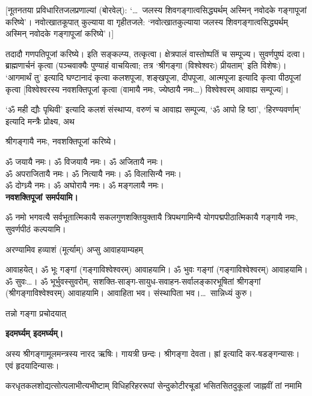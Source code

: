 {\small [नूतनतया प्रविधारितजलप्रणाल्यां (बोरवेल्): `\ldots\ जलस्य शिवगङ्गात्वसिद्ध्यर्थम् अस्मिन्
नवोदके गङ्गापूजां करिष्ये'। नवोत्खातकूपात् कुल्याया वा गृहीतजले: `नवोत्खातकुल्याया जलस्य
शिवगङ्गात्वसिद्ध्यर्थम् अस्मिन् नवोदके गङ्गापूजां करिष्ये'।]\par}

तदादौ गणपतिपूजां करिष्ये। इति सङ्कल्प्य, तत्कृत्वा। क्षेत्रपालं वास्तोष्पतिं च सम्पूज्य।
सुवर्णपुष्पं दत्वा। ब्राह्मणार्चनं कृत्वा (पञ्चवाक्यैः पुण्याहं वाचयित्वा; तत्र `श्रीगङ्गा
(विश्वेश्वरः) प्रीयताम्' इति विशेषः)। `आगमार्थं तु' इत्यादि घण्टानादं कृत्वा कलशपूजा,
शङ्खपूजा, दीपपूजा, आत्मपूजा इत्यादि कृत्वा पीठपूजां कृत्वा [विश्वेश्वरस्य नवशक्तिपूजां कृत्वा
(वामायै नमः, ज्येष्ठायै नमः\ldots) विश्वेश्वरम् आवाह्य सम्पूज्य]।

`ॐ मही द्यौः पृथिवी' इत्यादि कलशं संस्थाप्य, वरुणं च आवाह्य सम्पूज्य, `ॐ आपो हि ष्ठा',
`हिरण्यवर्णाम्' इत्यादि मन्त्रैः प्रोक्ष्य, अथ


श्रीगङ्गायै नमः, नवशक्तिपूजां करिष्ये।

\begin{center}
ॐ जयायै नमः। ॐ विजयायै नमः। ॐ अजितायै नमः।\\
ॐ अपराजितायै नमः। ॐ नित्यायै नमः। ॐ विलासिन्यै नमः।\\
ॐ दोग्ध्र्यै नमः। ॐ अघोरायै नमः। ॐ मङ्गलायै नमः।\\
\textbf{नवशक्तिपूजां समर्पयामि।}
\end{center}

ॐ नमो भगवत्यै सर्वभूतात्मिकायै सकलगुणशक्तियुक्तायै त्रिपथगामिन्यै योगपद्मपीठात्मिकायै
गङ्गायै नमः, सुवर्णपीठं कल्पयामि।

{अरण्यामिव हव्याशं (मूर्त्याम्) अप्सु आवाहयाम्यहम्}

आवाहयेत्। ॐ भूः गङ्गां (गङ्गाविश्वेश्वरम्) आवाहयामि। ॐ भुवः गङ्गां (गङ्गाविश्वेश्वरम्)
आवाहयामि। ॐ सुवः\ldots। ॐ भूर्भुवस्सुवरोम्, सशक्ति-साङ्ग-सायुध-सवाहन-सर्वालङ्कारभूषितां
श्रीगङ्गां (श्रीगङ्गाविश्वेश्वरम्) आवाहयामि। आवाहिता भव। संस्थापिता भव।\ldots\ सान्निध्यं कुरु।

{तन्नो गङ्गा प्रचोदयात्}
\centerline{\textbf{इदमर्घ्यम् इदमर्घ्यम्।}}

अस्य श्रीगङ्गामूलमन्त्रस्य नारद ऋषिः। गायत्री छन्दः। श्रीगङ्गा देवता। ह्रां इत्यादि
कर-षडङ्गन्यासः। एवं हृदयादिन्यासः।


{करधृतकलशोद्यत्सोत्पलाभीत्यभीष्टाम्}
{विधिहरिहररूपां सेन्दुकोटीरचूडां}
{भसितसितदुकूलां जाह्नवीं तां नमामि}

